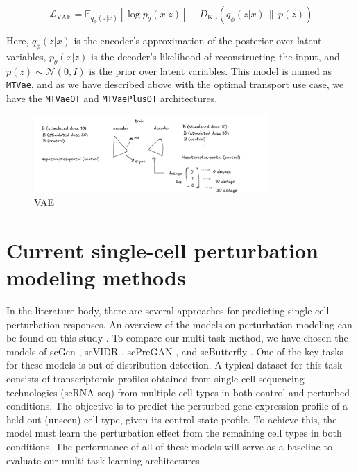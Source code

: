 \documentclass[12pt, a4paper]{article}
\begin{document}
\[
\mathcal{L}_{\text{VAE}} = \mathbb{E}_{q_\phi(z|x)}[\log p_\theta(x|z)] - D_{\text{KL}}(q_\phi(z|x) \,\|\, p(z))
\]

Here, $q_\phi(z|x)$ is the encoder's approximation of the posterior over latent variables, $p_\theta(x|z)$ is the decoder's likelihood of reconstructing the input, and $p(z) \sim \mathcal{N}(0, I)$ is the prior over latent variables. This model is named as \verb|MTVae|, and as we have described above with the optimal transport use case, we have the \verb|MTVaeOT| and \verb|MTVaePlusOT| architectures.

\begin{figure}
    \centering
    \includegraphics[width=0.8\textwidth]{vae_sketch.png}
    \caption{VAE}
\end{figure}


\section{Current single-cell perturbation modeling methods}

In the literature body, there are several approaches for predicting single-cell perturbation responses. An overview of the models on perturbation modeling can be found on this study \cite{gavriilidisMinireviewPerturbationModelling2024}. To compare our multi-task method, we have chosen the models of scGen \cite{lotfollahiScGenPredictsSinglecell2019}, scVIDR \cite{kanaGenerativeModelingSinglecell2023}, scPreGAN \cite{weiScPreGANDeepGenerative2022}, and scButterfly \cite{caoScButterflyVersatileSinglecell2024}.
One of the key tasks for these models is out-of-distribution detection. A typical dataset for this task consists of transcriptomic profiles obtained from single-cell sequencing technologies (scRNA-seq) from multiple cell types in both control and perturbed conditions. The objective is to predict the perturbed gene expression profile of a held-out (unseen) cell type, given its control-state profile. To achieve this, the model must learn the perturbation effect from the remaining cell types in both conditions. The performance of all of these models will serve as a baseline to evaluate our multi-task learning architectures.
\end{document}
